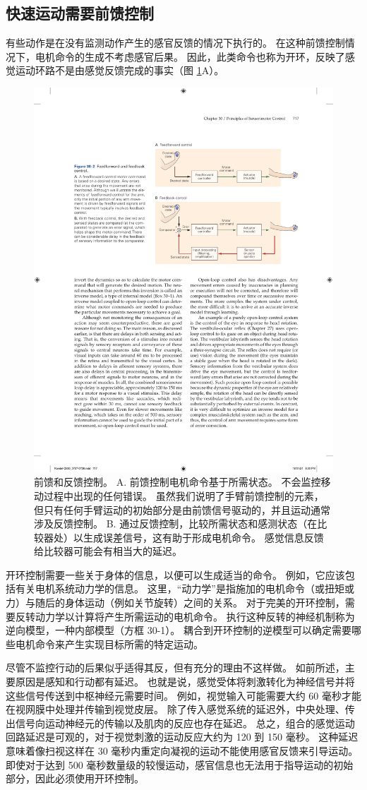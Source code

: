 \subsection{快速运动需要前馈控制}

有些动作是在没有监测动作产生的感官反馈的情况下执行的。
在这种前馈控制情况下，电机命令的生成不考虑感官后果。
因此，此类命令也称为开环，反映了感觉运动环路不是由感觉反馈完成的事实（图 \ref{fig:30_2}A）。


\begin{figure}[htbp]
	\centering
	\includegraphics[width=0.65\linewidth]{chap30/fig_30_2}
	\caption{前馈和反馈控制。 A. 前馈控制电机命令基于所需状态。 不会监控移动过程中出现的任何错误。 虽然我们说明了手臂前馈控制的元素，但只有任何手臂运动的初始部分是由前馈信号驱动的，并且运动通常涉及反馈控制。 B. 通过反馈控制，比较所需状态和感测状态（在比较器处）以生成误差信号，这有助于形成电机命令。 感觉信息反馈给比较器可能会有相当大的延迟。}
	\label{fig:30_2}
\end{figure}


开环控制需要一些关于身体的信息，以便可以生成适当的命令。
例如，它应该包括有关电机系统动力学的信息。
这里，“动力学”是指施加的电机命令（或扭矩或力）与随后的身体运动（例如关节旋转）之间的关系。
对于完美的开环控制，需要反转动力学以计算将产生所需运动的电机命令。
执行这种反转的神经机制称为逆向模型，一种内部模型（方框 30-1）。
耦合到开环控制的逆模型可以确定需要哪些电机命令来产生实现目标所需的特定运动。


尽管不监控行动的后果似乎适得其反，但有充分的理由不这样做。
如前所述，主要原因是感知和行动都有延迟。
也就是说，感觉受体将刺激转化为神经信号并将这些信号传送到中枢神经元需要时间。
例如，视觉输入可能需要大约 60 毫秒才能在视网膜中处理并传输到视觉皮层。
除了传入感觉系统的延迟外，中央处理、传出信号向运动神经元的传输以及肌肉的反应也存在延迟。
总之，组合的感觉运动回路延迟是可观的，对于视觉刺激的运动反应大约为 120 到 150 毫秒。
这种延迟意味着像扫视这样在 30 毫秒内重定向凝视的运动不能使用感官反馈来引导运动。
即使对于达到 500 毫秒数量级的较慢运动，感官信息也无法用于指导运动的初始部分，因此必须使用开环控制。


